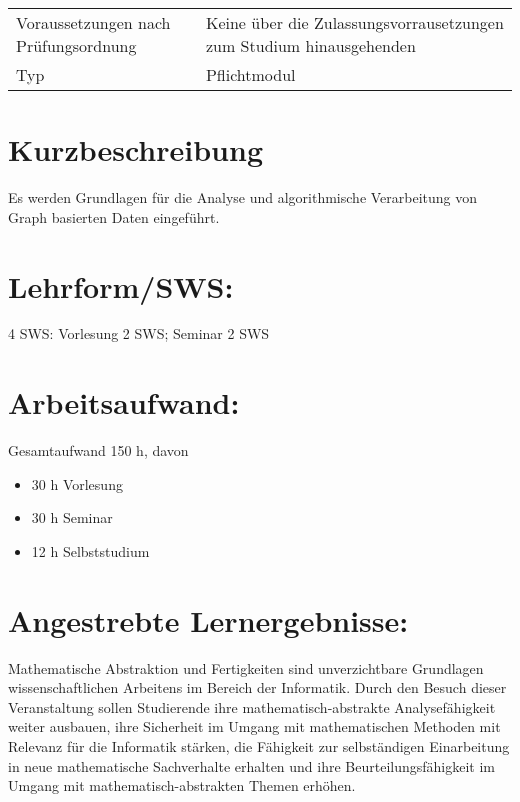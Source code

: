 \begin{longtable}[]{@{}ll@{}}
\begin{minipage}[t]{0.12\columnwidth}\raggedright\strut
Voraussetzungen nach Prüfungsordnung\strut
\end{minipage} & \begin{minipage}[t]{0.12\columnwidth}\raggedright\strut
Keine über die Zulassungsvorrausetzungen zum Studium
hinausgehenden\strut
\end{minipage}\tabularnewline
\begin{minipage}[t]{0.12\columnwidth}\raggedright\strut
Typ\strut
\end{minipage} & \begin{minipage}[t]{0.12\columnwidth}\raggedright\strut
Pflichtmodul\strut
\end{minipage}\tabularnewline
\bottomrule
\end{longtable}

\section*{Kurzbeschreibung}\label{kurzbeschreibung-1}

Es werden Grundlagen für die Analyse und algorithmische Verarbeitung von
Graph basierten Daten eingeführt.

\section*{Lehrform/SWS:}\label{lehrformsws-2}

4 SWS: Vorlesung 2 SWS; Seminar 2 SWS

\section*{Arbeitsaufwand:}\label{arbeitsaufwand-2}

Gesamtaufwand 150 h, davon

\begin{itemize}
\item
  30 h Vorlesung
\item
  30 h Seminar
\item
  12 h Selbststudium
\end{itemize}

\section*{Angestrebte
Lernergebnisse:}\label{angestrebte-lernergebnisse-2}

Mathematische Abstraktion und Fertigkeiten sind unverzichtbare
Grundlagen wissenschaftlichen Arbeitens im Bereich der Informatik. Durch
den Besuch dieser Veranstaltung sollen Studierende ihre
mathematisch-abstrakte Analysefähigkeit weiter ausbauen, ihre Sicherheit
im Umgang mit mathematischen Methoden mit Relevanz für die Informatik
stärken, die Fähigkeit zur selbständigen Einarbeitung in neue
mathematische Sachverhalte erhalten und ihre Beurteilungsfähigkeit im
Umgang mit mathematisch-abstrakten Themen erhöhen.

